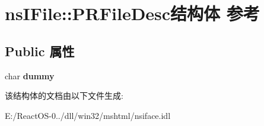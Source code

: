 \hypertarget{structns_i_file_1_1_p_r_file_desc}{}\section{ns\+I\+File\+:\+:P\+R\+File\+Desc结构体 参考}
\label{structns_i_file_1_1_p_r_file_desc}
\subsection*{Public 属性}
\begin{DoxyCompactItemize}
\item 
\mbox{\label{structns_i_file_1_1_p_r_file_desc_aa651ded894a473ed59b1868f9d182f60}} 
char {\bfseries dummy}
\end{DoxyCompactItemize}


该结构体的文档由以下文件生成\+:\begin{DoxyCompactItemize}
\item 
E\+:/\+React\+O\+S-\/0../dll/win32/mshtml/nsiface.\+idl\end{DoxyCompactItemize}
